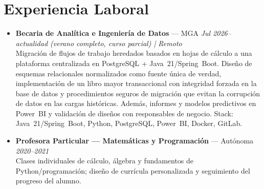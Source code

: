 \documentclass[10pt,a4paper]{article}
\begin{document}
\section{Experiencia Laboral}
{\small
\begin{itemize}

  \item \textbf{Becaria de Anal\'itica e Ingenier\'ia de Datos} --- MGA \hfill \textit{Jul 2026--actualidad (verano completo, curso parcial) | Remoto}\\
  Migraci\'on de flujos de trabajo heredados basados en hojas de c\'alculo a una plataforma centralizada en
  PostgreSQL + Java~21/Spring~Boot. Dise\~{n}o de esquemas relacionales normalizados como fuente \'unica de
  verdad, implementaci\'on de un libro mayor transaccional con integridad forzada en la base de datos y
  procedimientos seguros de migraci\'on que evitan la corrupci\'on de datos en las cargas hist\'oricas.
  Adem\'as, informes y modelos predictivos en Power~BI y validaci\'on de dise\~{n}os con responsables de negocio.
  Stack: Java~21/Spring~Boot, Python, PostgreSQL, Power~BI, Docker, GitLab.

  \item \textbf{Profesora Particular --- Matem\'aticas y Programaci\'on} --- Aut\'onoma \hfill \textit{2020--2021}\\
  Clases individuales de c\'alculo, \'algebra y fundamentos de Python/programaci\'on;
  dise\~{n}o de curr\'icula personalizada y seguimiento del progreso del alumno.

\end{itemize}
}

\end{document}

